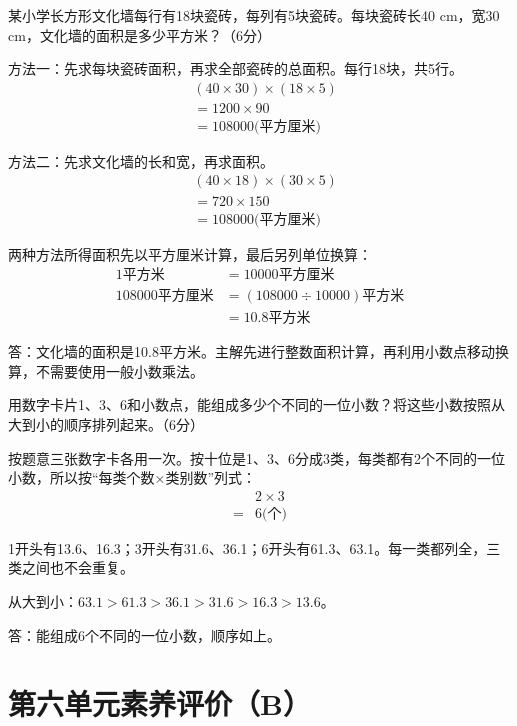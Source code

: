 某小学长方形文化墙每行有18块瓷砖，每列有5块瓷砖。每块瓷砖长40 cm，宽30 cm，文化墙的面积是多少平方米？（6分）\par
\begin{BookAnswer}
方法一：先求每块瓷砖面积，再求全部瓷砖的总面积。每行18块，共5行。\[\begin{aligned}&(40\times30)\times(18\times5)\\&=1200\times90\\&=108000\text{(平方厘米)}\end{aligned}\]\par 方法二：先求文化墙的长和宽，再求面积。\[\begin{aligned}&(40\times18)\times(30\times5)\\&=720\times150\\&=108000\text{(平方厘米)}\end{aligned}\]\par 两种方法所得面积先以平方厘米计算，最后另列单位换算：\[\begin{aligned}1\text{平方米}&=10000\text{平方厘米}\\108000\text{平方厘米}&=(108000\div10000)\text{平方米}\\&=10.8\text{平方米}\end{aligned}\]\par 答：文化墙的面积是10.8平方米。主解先进行整数面积计算，再利用小数点移动换算，不需要使用一般小数乘法。
\end{BookAnswer}

用数字卡片1、3、6和小数点，能组成多少个不同的一位小数？将这些小数按照从大到小的顺序排列起来。（6分）\par
\begin{BookAnswer}
按题意三张数字卡各用一次。按十位是1、3、6分成3类，每类都有2个不同的一位小数，所以按“每类个数×类别数”列式：\[\begin{aligned}&2\times3\\={}&6\text{(个)}\end{aligned}\]\par 1开头有13.6、16.3；3开头有31.6、36.1；6开头有61.3、63.1。每一类都列全，三类之间也不会重复。\par 从大到小：\(63.1>61.3>36.1>31.6>16.3>13.6\)。\par 答：能组成6个不同的一位小数，顺序如上。
\end{BookAnswer}


\section{第六单元素养评价（B）}

